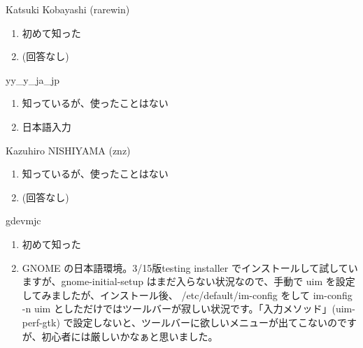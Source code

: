 \begin{prework}{ Katsuki Kobayashi (rarewin) }
  \begin{enumerate}
  \item 初めて知った
  \item (回答なし)
  \end{enumerate}
\end{prework}

\begin{prework}{ yy\_y\_ja\_jp }
  \begin{enumerate}
  \item 知っているが、使ったことはない
  \item 日本語入力
  \end{enumerate}
\end{prework}

\begin{prework}{ Kazuhiro NISHIYAMA (znz) }
  \begin{enumerate}
  \item 知っているが、使ったことはない
  \item (回答なし)
  \end{enumerate}
\end{prework}

\begin{prework}{ gdevmjc }
  \begin{enumerate}
  \item 初めて知った
  \item GNOME の日本語環境。3/15版testing installer でインストールして試していますが、gnome-initial-setup はまだ入らない状況なので、手動で uim を設定してみましたが、インストール後、 /etc/default/im-config をして im-config -n uim としただけではツールバーが寂しい状況です。「入力メソッド」(uim-perf-gtk) で設定しないと、ツールバーに欲しいメニューが出てこないのですが、初心者には厳しいかなぁと思いました。
  \end{enumerate}
\end{prework}
